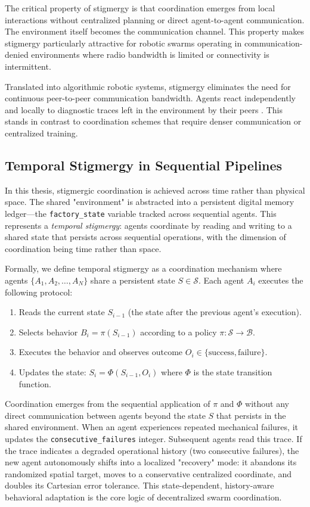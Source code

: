 ﻿\documentclass[12pt,a4paper,oneside]{report}
\begin{document}
The critical property of stigmergy is that coordination emerges from local interactions without centralized planning or direct agent-to-agent communication. The environment itself becomes the communication channel. This property makes stigmergy particularly attractive for robotic swarms operating in communication-denied environments where radio bandwidth is limited or connectivity is intermittent.

Translated into algorithmic robotic systems, stigmergy eliminates the need for continuous peer-to-peer communication bandwidth. Agents react independently and locally to diagnostic traces left in the environment by their peers \cite{bongard2006resilient}. This stands in contrast to coordination schemes that require denser communication or centralized training.

\subsection{Temporal Stigmergy in Sequential Pipelines}

In this thesis, stigmergic coordination is achieved across time rather than physical space. The shared "environment" is abstracted into a persistent digital memory ledger---the \texttt{factory\_state} variable tracked across sequential agents. This represents a \textit{temporal stigmergy}: agents coordinate by reading and writing to a shared state that persists across sequential operations, with the dimension of coordination being time rather than space.

Formally, we define temporal stigmergy as a coordination mechanism where agents $\{A_1, A_2, \ldots, A_N\}$ share a persistent state $S \in \mathcal{S}$. Each agent $A_i$ executes the following protocol:

\begin{enumerate}
    \item Reads the current state $S_{i-1}$ (the state after the previous agent's execution).
    \item Selects behavior $B_i = \pi(S_{i-1})$ according to a policy $\pi: \mathcal{S} \rightarrow \mathcal{B}$.
    \item Executes the behavior and observes outcome $O_i \in \{\text{success}, \text{failure}\}$.
    \item Updates the state: $S_i = \Phi(S_{i-1}, O_i)$ where $\Phi$ is the state transition function.
\end{enumerate}

Coordination emerges from the sequential application of $\pi$ and $\Phi$ without any direct communication between agents beyond the state $S$ that persists in the shared environment. When an agent experiences repeated mechanical failures, it updates the \texttt{consecutive\_failures} integer. Subsequent agents read this trace. If the trace indicates a degraded operational history (two consecutive failures), the new agent autonomously shifts into a localized "recovery" mode: it abandons its randomized spatial target, moves to a conservative centralized coordinate, and doubles its Cartesian error tolerance. This state-dependent, history-aware behavioral adaptation is the core logic of decentralized swarm coordination.
\end{document}
